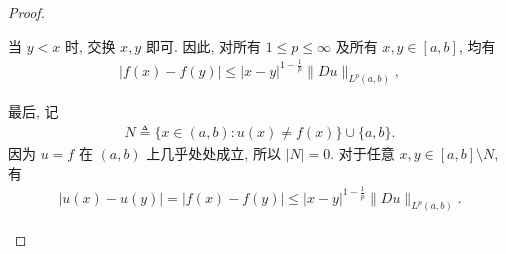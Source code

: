 \documentclass[../../main.tex]{subfiles}
\begin{document}
\begin{proof}
\begin{enumerate}[(1)]
当 $y<x$ 时, 交换 $x,y$ 即可. 因此, 对所有 $1\leqslant p\leqslant\infty$ 及所有 $x,y\in[a,b]$, 均有
\begin{align*}
|f(x)-f(y)|
\leqslant
|x-y|^{1-\frac{1}{p}}\|Du\|_{L^p(a,b)},
\end{align*}

最后, 记
\begin{align*}
N\triangleq
\{x\in(a,b):u(x)\neq f(x)\}\cup\{a,b\}.
\end{align*}
因为 $u=f$ 在 $(a,b)$ 上几乎处处成立, 所以 $|N|=0$. 对于任意 $x,y\in[a,b]\setminus N$, 有
\begin{align*}
|u(x)-u(y)|
=|f(x)-f(y)|
\leqslant
|x-y|^{1-\frac{1}{p}}\|Du\|_{L^p(a,b)}.
\end{align*}
\end{enumerate}
\end{proof}
\end{document}
